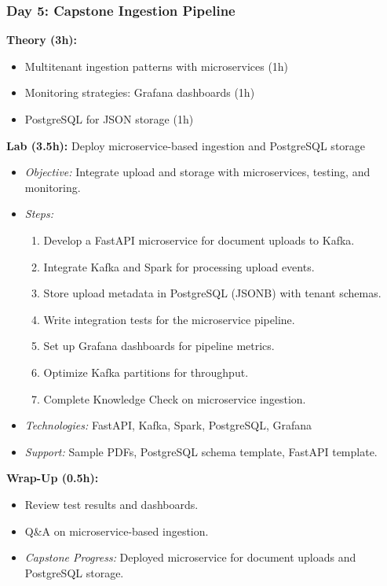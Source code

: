 \documentclass[11pt]{article}
\begin{document}
\subsubsection{Day 5: Capstone Ingestion Pipeline}
\textbf{Theory (3h):}
\begin{itemize}
    \item Multitenant ingestion patterns with microservices (1h)
    \item Monitoring strategies: Grafana dashboards (1h)
    \item PostgreSQL for JSON storage (1h)
\end{itemize}
\textbf{Lab (3.5h):} Deploy microservice-based ingestion and PostgreSQL storage
\begin{itemize}
    \item \textit{Objective:} Integrate upload and storage with microservices, testing, and monitoring.
    \item \textit{Steps:}
        \begin{enumerate}
            \item Develop a FastAPI microservice for document uploads to Kafka.
            \item Integrate Kafka and Spark for processing upload events.
            \item Store upload metadata in PostgreSQL (JSONB) with tenant schemas.
            \item Write integration tests for the microservice pipeline.
            \item Set up Grafana dashboards for pipeline metrics.
            \item Optimize Kafka partitions for throughput.
            \item Complete Knowledge Check on microservice ingestion.
        \end{enumerate}
    \item \textit{Technologies:} FastAPI, Kafka, Spark, PostgreSQL, Grafana
    \item \textit{Support:} Sample PDFs, PostgreSQL schema template, FastAPI template.
\end{itemize}
\textbf{Wrap-Up (0.5h):}
\begin{itemize}
    \item Review test results and dashboards.
    \item Q\&A on microservice-based ingestion.
    \item \textit{Capstone Progress:} Deployed microservice for document uploads and PostgreSQL storage.
\end{itemize}
\end{document}
